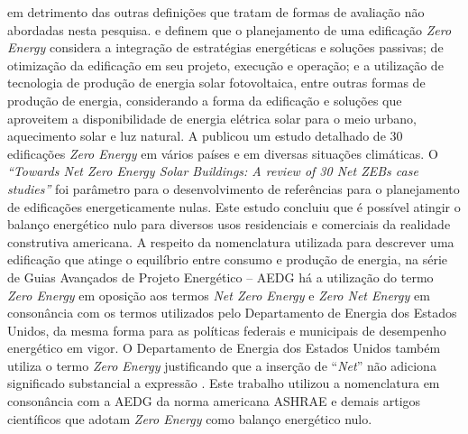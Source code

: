 em detrimento das outras definições que tratam de formas de avaliação não 
abordadas nesta pesquisa.\vspace*{0.3cm} \newline
\textcite{Didone2014} e \textcite{Athienitis2015} definem que o planejamento de 
uma edificação \textit{Zero Energy} considera a integração de estratégias energéticas 
e soluções passivas; de otimização da edificação em seu projeto, execução e 
operação; e a utilização de tecnologia de produção de energia solar 
fotovoltaica, entre outras formas de produção de energia, considerando a 
forma da edificação e soluções que aproveitem a disponibilidade de energia 
elétrica solar para o meio urbano, aquecimento solar e luz natural.\vspace*{0.3cm} \newline
A \textcite{InternationalEnergyAgency-IEA2014} publicou um estudo detalhado de 
30 edificações \textit{Zero Energy} em vários países e em diversas situações climáticas. 
O \textit{“Towards Net Zero Energy Solar Buildings: A review of 30 Net ZEBs case studies”} 
foi parâmetro para o desenvolvimento de referências para o planejamento de edificações 
energeticamente nulas. Este estudo concluiu que é possível atingir o balanço energético 
nulo para diversos usos residenciais e comerciais da realidade construtiva americana.\vspace*{0.3cm} \newline
A respeito da nomenclatura utilizada para descrever uma edificação que atinge 
o equilíbrio entre consumo e produção de energia, na série de Guias Avançados de Projeto 
Energético – AEDG \cite{AmericanSocietyofHeatingRefrigeratingandAir-ConditioningEngineers-ASHRAE2019} 
há a utilização do termo \textit{Zero Energy} em oposição aos termos \textit{Net Zero Energy} 
e \textit{Zero Net Energy} em consonância com os termos utilizados pelo Departamento 
de Energia dos Estados Unidos, da mesma forma para as políticas federais e municipais 
de desempenho energético em vigor. O Departamento de Energia dos Estados Unidos também 
utiliza o termo \textit{Zero Energy} justificando que a inserção de “\textit{Net}” não 
adiciona significado substancial a expressão \cite{U.S.DepartmentofEnergy-USDOE2015a}. 
Este trabalho utilizou a nomenclatura em consonância com a AEDG da norma americana ASHRAE 
e demais artigos científicos que adotam \textit{Zero Energy} como balanço energético nulo.

